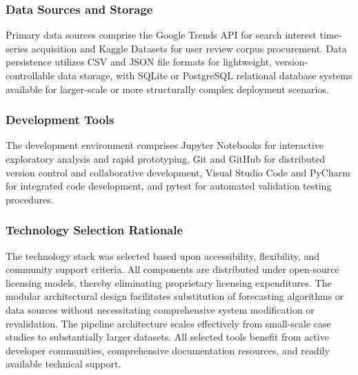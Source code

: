 \subsubsection{Data Sources and Storage}
Primary data sources comprise the Google Trends API for search interest time-series acquisition and Kaggle Datasets for user review corpus procurement. Data persistence utilizes CSV and JSON file formats for lightweight, version-controllable data storage, with SQLite or PostgreSQL relational database systems available for larger-scale or more structurally complex deployment scenarios.

\subsubsection{Development Tools}
The development environment comprises Jupyter Notebooks for interactive exploratory analysis and rapid prototyping, Git and GitHub for distributed version control and collaborative development, Visual Studio Code and PyCharm for integrated code development, and pytest for automated validation testing procedures.

\subsubsection{Technology Selection Rationale}
The technology stack was selected based upon accessibility, flexibility, and community support criteria. All components are distributed under open-source licensing models, thereby eliminating proprietary licensing expenditures. The modular architectural design facilitates substitution of forecasting algorithms or data sources without necessitating comprehensive system modification or revalidation. The pipeline architecture scales effectively from small-scale case studies to substantially larger datasets. All selected tools benefit from active developer communities, comprehensive documentation resources, and readily available technical support.
